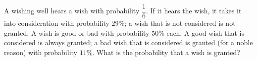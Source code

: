 A wishing well hears a wish with probability $\dfrac16$. If it hears the wish, it takes it into consideration with probability $29\%$; a wish that is not considered is not granted. A wish is good or bad with probability $50\%$ each. A good wish that is considered is always granted; a bad wish that is considered is granted (for a noble reason) with probability $11\%$. What is the probability that a wish is granted?
